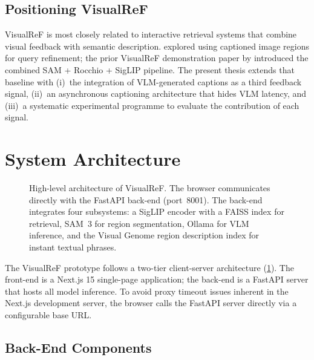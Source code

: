 \documentclass[12pt,a4paper]{article}
\begin{document}
\subsection{Positioning VisualReF}

VisualReF is most closely related to interactive retrieval systems that combine
visual feedback with semantic description. \citet{Custodio2023} explored using
captioned image regions for query refinement; the prior VisualReF
demonstration paper by \citet{Khaertdinov2025} introduced the combined SAM
+ Rocchio + SigLIP pipeline. The present thesis extends that baseline with
(i)~the integration of VLM-generated captions as a third feedback signal,
(ii)~an asynchronous captioning architecture that hides VLM latency, and
(iii)~a systematic experimental programme to evaluate the contribution of
each signal.

\section{System Architecture}
\label{sec:system}

\begin{figure}[t]
  \centering
  \caption{High-level architecture of VisualReF.
  The browser communicates directly with the FastAPI back-end (port~8001).
  The back-end integrates four subsystems: a SigLIP encoder with a FAISS index
  for retrieval, SAM~3 for region segmentation, Ollama for VLM inference, and
  the Visual Genome region description index for instant textual phrases.}
  \label{fig:architecture}
\end{figure}

The VisualReF prototype follows a two-tier client-server architecture
(\cref{fig:architecture}). The front-end is a Next.js 15 single-page
application; the back-end is a FastAPI server that hosts all model inference.
To avoid proxy timeout issues inherent in the Next.js development server,
the browser calls the FastAPI server directly via a configurable base URL.

\subsection{Back-End Components}
\end{document}
